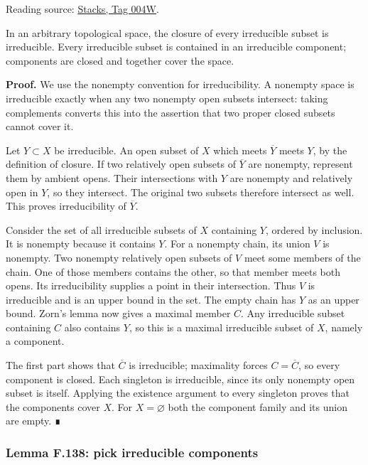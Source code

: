 \documentclass[11pt,a4paper,openany]{report}
\newcounter{none}
\begin{document}
Reading source: \href{https://stacks.math.columbia.edu/tag/004W}{Stacks, Tag 004W}.

In an arbitrary topological space, the closure of every irreducible subset is irreducible. Every irreducible subset is contained in an irreducible component; components are closed and together cover the space.

\textbf{Proof.} We use the nonempty convention for irreducibility. A nonempty space is irreducible exactly when any two nonempty open subsets intersect: taking complements converts this into the assertion that two proper closed subsets cannot cover it.

Let \(Y\subset X\) be irreducible. An open subset of \(X\) which meets \(\overline Y\) meets \(Y\), by the definition of closure. If two relatively open subsets of \(\overline Y\) are nonempty, represent them by ambient opens. Their intersections with \(Y\) are nonempty and relatively open in \(Y\), so they intersect. The original two subsets therefore intersect as well. This proves irreducibility of \(\overline Y\).

Consider the set of all irreducible subsets of \(X\) containing \(Y\), ordered by inclusion. It is nonempty because it contains \(Y\). For a nonempty chain, its union \(V\) is nonempty. Two nonempty relatively open subsets of \(V\) meet some members of the chain. One of those members contains the other, so that member meets both opens. Its irreducibility supplies a point in their intersection. Thus \(V\) is irreducible and is an upper bound in the set. The empty chain has \(Y\) as an upper bound. Zorn's lemma now gives a maximal member \(C\). Any irreducible subset containing \(C\) also contains \(Y\), so this is a maximal irreducible subset of \(X\), namely a component.

The first part shows that \(\overline C\) is irreducible; maximality forces \(C=\overline C\), so every component is closed. Each singleton is irreducible, since its only nonempty open subset is itself. Applying the existence argument to every singleton proves that the components cover \(X\). For \(X=\varnothing\) both the component family and its union are empty. ∎

\label{AG-RG-S05-topology-lemma-pick-irreducible-components}

\subsubsection{Lemma F.138: pick irreducible components}\label{AG-RG-S05-lemma-f.138-pick-irreducible-components}
\end{document}
